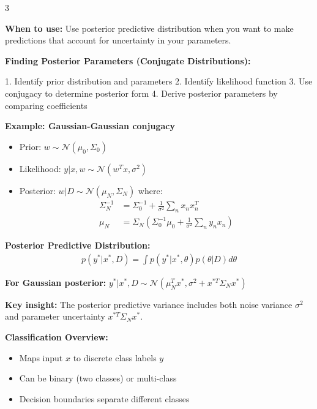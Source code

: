 \documentclass[10pt,landscape]{article}
\begin{document}
\begin{multicols}{3}
\begin{tcolorbox}[breakable, title=1.4 Posterior Parameters \& Predictive Distribution, colback=regression,boxsep=1pt,left=1pt,right=1pt,top=1pt,bottom=1pt]
\textbf{When to use:} Use posterior predictive distribution when you want to make predictions that account for uncertainty in your parameters.

\textbf{Finding Posterior Parameters (Conjugate Distributions):}

1. Identify prior distribution and parameters
2. Identify likelihood function
3. Use conjugacy to determine posterior form
4. Derive posterior parameters by comparing coefficients

\textbf{Example: Gaussian-Gaussian conjugacy}
\begin{itemize}[leftmargin=*,noitemsep,topsep=0pt]
    \item Prior: $w \sim \mathcal{N}(\mu_0, \Sigma_0)$
    \item Likelihood: $y|x, w \sim \mathcal{N}(w^Tx, \sigma^2)$
    \item Posterior: $w|D \sim \mathcal{N}(\mu_N, \Sigma_N)$ where:
    \begin{align}
    \Sigma_N^{-1} &= \Sigma_0^{-1} + \frac{1}{\sigma^2}\sum_{n}x_nx_n^T\\
    \mu_N &= \Sigma_N(\Sigma_0^{-1}\mu_0 + \frac{1}{\sigma^2}\sum_{n}y_nx_n)
    \end{align}
\end{itemize}

\textbf{Posterior Predictive Distribution:}
\begin{align}
p(y^*|x^*, D) = \int p(y^*|x^*, \theta)p(\theta|D)d\theta
\end{align}

\textbf{For Gaussian posterior:}
$y^*|x^*, D \sim \mathcal{N}(\mu_N^Tx^*, \sigma^2 + x^{*T}\Sigma_Nx^*)$

\textbf{Key insight:} The posterior predictive variance includes both noise variance $\sigma^2$ and parameter uncertainty $x^{*T}\Sigma_Nx^*$.
\end{tcolorbox}

\begin{tcolorbox}[breakable, title=2. Classification Concepts, colback=classification,boxsep=1pt,left=1pt,right=1pt,top=1pt,bottom=1pt]
\textbf{Classification Overview:}
\begin{itemize}[leftmargin=*,noitemsep,topsep=0pt]
    \item Maps input $x$ to discrete class labels $y$
    \item Can be binary (two classes) or multi-class
    \item Decision boundaries separate different classes
\end{itemize}


\end{tcolorbox}
\end{multicols}
\end{document}
